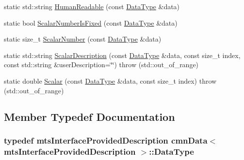 \begin{DoxyCompactItemize}
\item 
static std\+::string \hyperlink{classcmn_data_3_01mts_interface_provided_description_01_4_ab45ebb352f76f32dc5d39ed6492370ad}{Human\+Readable} (const \hyperlink{classcmn_data_3_01mts_interface_provided_description_01_4_af19cd473dc5065308646606d55246bc6}{Data\+Type} \&data)
\item 
static bool \hyperlink{classcmn_data_3_01mts_interface_provided_description_01_4_a09ac4bf1060374d60412dbc8b19436f0}{Scalar\+Number\+Is\+Fixed} (const \hyperlink{classcmn_data_3_01mts_interface_provided_description_01_4_af19cd473dc5065308646606d55246bc6}{Data\+Type} \&data)
\item 
static size\+\_\+t \hyperlink{classcmn_data_3_01mts_interface_provided_description_01_4_ab66bf49c31e15615e90eb7e0dfdd7022}{Scalar\+Number} (const \hyperlink{classcmn_data_3_01mts_interface_provided_description_01_4_af19cd473dc5065308646606d55246bc6}{Data\+Type} \&data)
\item 
static std\+::string \hyperlink{classcmn_data_3_01mts_interface_provided_description_01_4_a609370f71724a052a4da55025660c23c}{Scalar\+Description} (const \hyperlink{classcmn_data_3_01mts_interface_provided_description_01_4_af19cd473dc5065308646606d55246bc6}{Data\+Type} \&data, const size\+\_\+t index, const std\+::string \&user\+Description=\char`\"{}\char`\"{})  throw (std\+::out\+\_\+of\+\_\+range)
\item 
static double \hyperlink{classcmn_data_3_01mts_interface_provided_description_01_4_a069b403ae749f6c19e71a339c82c9188}{Scalar} (const \hyperlink{classcmn_data_3_01mts_interface_provided_description_01_4_af19cd473dc5065308646606d55246bc6}{Data\+Type} \&data, const size\+\_\+t index)  throw (std\+::out\+\_\+of\+\_\+range)
\end{DoxyCompactItemize}


\subsection{Member Typedef Documentation}
\hypertarget{classcmn_data_3_01mts_interface_provided_description_01_4_af19cd473dc5065308646606d55246bc6}{}
\subsubsection[{Data\+Type}]{\setlength{\rightskip}{0pt plus 5cm}typedef {\bf mts\+Interface\+Provided\+Description} {\bf cmn\+Data}$<$ {\bf mts\+Interface\+Provided\+Description} $>$\+::{\bf Data\+Type}}\label{classcmn_data_3_01mts_interface_provided_description_01_4_af19cd473dc5065308646606d55246bc6}


